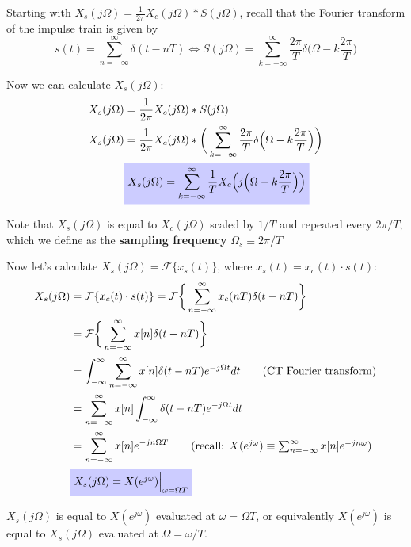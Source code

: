 \documentclass[10pt]{beamer}
\begin{document}
%
\begin{frame}

Starting with $X_s(j\Omega) = \frac{1}{2\pi}X_c(j\Omega)\ast S(j\Omega)$, recall that the Fourier transform of the impulse train is given by
\begin{equation*}
s(t) = \sum_{n=-\infty}^\infty \delta(t-nT) \Longleftrightarrow S(j\Omega) = \sum_{k=-\infty}^\infty \frac{2\pi}{T}\delta\Big(\Omega-k\frac{2\pi}{T}\Big)
\end{equation*}

Now we can calculate $X_s(j\Omega)$:
\begin{align} \nonumber
X_s(j\Omega) &= \frac{1}{2\pi}X_c(j\Omega) \ast S(j\Omega) \\ \nonumber
X_s(j\Omega) &= \frac{1}{2\pi}X_c(j\Omega) \ast \bigg(\sum_{k=-\infty}^\infty\frac{2\pi}{T}\delta\Big(\Omega-k\frac{2\pi}{T}\Big)\bigg) \\ 
&\tikz[baseline]{
	\node[fill=blue!20,anchor=base] (t1) {$X_s(j\Omega) = \displaystyle\sum_{k=-\infty}^\infty\frac{1}{T}X_c\Big(j\Big(\Omega-k\frac{2\pi}{T}\Big)\Big)$};} \label{eq:Xs1}
\end{align}

Note that $X_s(j\Omega)$ is equal to $X_c(j\Omega)$ scaled by $1/T$ and repeated every $2\pi/T$, which we define as the \textbf{sampling frequency} $\Omega_s \equiv  2\pi/T$
\end{frame}

%
\begin{frame}
Now let's calculate $X_s(j\Omega) = \mathcal{F}\{x_s(t)\}$, where $x_s(t) = x_c(t)\cdot s(t)$:
\begin{align} \nonumber
X_s(j\Omega) &= \mathcal{F}\{x_c(t)\cdot s(t)\} = \mathcal{F}\bigg\lbrace \sum_{n=-\infty}^{\infty} x_c(nT)\delta(t-nT) \bigg\rbrace \\ \nonumber
&= \mathcal{F}\bigg\lbrace \sum_{n=-\infty}^{\infty} x[n]\delta(t-nT) \bigg\rbrace \\ \nonumber
&= \int_{-\infty}^{\infty}\sum_{n=-\infty}^{\infty} x[n]\delta(t-nT)e^{-j\Omega t}dt \tag{CT Fourier transform} \\ \nonumber
&= \sum_{n=-\infty}^{\infty} x[n]\int_{-\infty}^{\infty}\delta(t-nT)e^{-j\Omega t}dt \\ \nonumber
&= \sum_{n=-\infty}^{\infty} x[n]e^{-jn\Omega T} \tag{recall: $X(e^{j\omega}) \equiv \sum_{n=-\infty}^{\infty} x[n]e^{-jn\omega}$} \\
&\tikz[baseline]{
	\node[fill=blue!20,anchor=base] (t1) {$X_s(j\Omega) = X(e^{j\omega})\Big|_{\omega=\Omega T}$};} \label{eq:Xs2}
\end{align}

$X_s(j\Omega)$ is equal to $X(e^{j\omega})$ evaluated at $\omega = \Omega T$, or equivalently $X(e^{j\omega})$  is equal to $X_s(j\Omega)$ evaluated at $\Omega = \omega/T$.
\end{frame}
\end{document}

